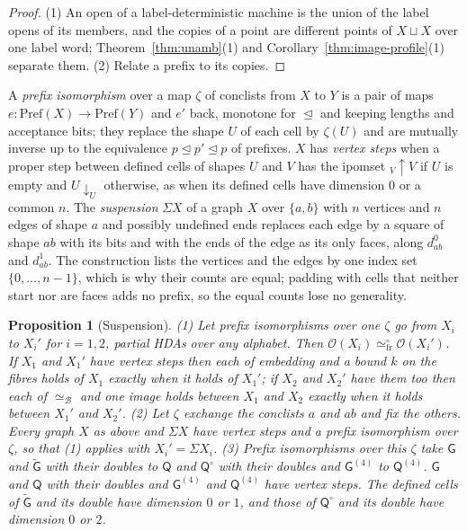 \documentclass{lmcs}
\newtheorem{proposition}[theorem]{Proposition}
\theoremstyle{definition}
\theoremstyle{remark}
\newcommand{\Op}{\mathcal{O}}
\newcommand{\ab}{\{a,b\}}
\newcommand{\starter}[2]{{}_{#2}{\uparrow}{#1}}
\newcommand{\terminator}[2]{{#1}{\downarrow}_{#2}}%
\newcommand{\Pref}{\mathrm{Pref}}
\newcommand{\ext}{\trianglelefteq}
\newcommand{\eqFrF}{\simeq^{\circ}_{\mathrm{fr}}}
\providecommand{\dsum}{\sqcup}
\providecommand{\wQ}{\mathsf{Q}}
\providecommand{\eqB}{\simeq_{\mathcal{B}}}
\providecommand{\dsum}{\sqcup}
\providecommand{\wG}{\mathsf{G}}
\providecommand{\wGt}{\tilde{\mathsf{G}}}
\providecommand{\wQ}{\mathsf{Q}}
\begin{document}
\begin{proof}
(1) An open of a label-deterministic machine is the union of the label opens of its
members, and the copies of a point are different points of $X\dsum X$
over one label word; Theorem~\ref{thm:unamb}(1) and
Corollary~\ref{thm:image-profile}(1) separate
them. (2) Relate
a prefix to its copies.
\end{proof}

A \emph{prefix isomorphism} over a map $\zeta$ of conclists from $X$ to $Y$ is a pair of maps
$e\colon\Pref(X)\to\Pref(Y)$ and $e'$ back, monotone for $\ext$ and keeping lengths and acceptance bits; they
replace the shape $U$ of each cell by $\zeta(U)$ and are mutually inverse up to the equivalence $p\ext p'\ext p$
of prefixes. $X$ has \emph{vertex steps} when a proper step between defined cells of shapes $U$ and
$V$ has the ipomset $\starter{V}{V}$ if $U$ is empty and $\terminator{U}{U}$ otherwise, as when its defined cells
have dimension $0$ or a common $n$. The
\emph{suspension} $\Sigma X$ of a graph $X$ over $\ab$ with $n$ vertices and $n$ edges of shape $a$ and possibly
undefined ends replaces each edge by a square of shape $ab$ with its bits and with the ends of the edge as its only
faces, along $d^0_{ab}$ and $d^1_{ab}$. The construction lists the vertices and the edges by one index set $\{0,\dots,n-1\}$, which is why their counts are
equal; padding with cells that neither start nor are faces adds no prefix, so the equal counts lose
no generality.

\begin{proposition}[Suspension]\label{prop:suspension}
(1) Let prefix isomorphisms over one $\zeta$ go from $X_i$ to $X_i'$ for $i=1,2$, partial HDAs over any alphabet.
  Then $\Op(X_i)\eqFrF\Op(X_i')$. If $X_1$ and $X_1'$ have vertex steps then each of
  embedding and a bound $k$ on the fibres holds of $X_1$ exactly when it holds of $X_1'$;
  if $X_2$ and $X_2'$ have them too then each of $\eqB$ and one image holds between $X_1$ and $X_2$ exactly when it
  holds between $X_1'$ and $X_2'$.
(2) Let $\zeta$ exchange the conclists $a$ and $ab$ and fix the others. Every graph $X$ as above and $\Sigma X$
  have vertex steps and a prefix isomorphism over $\zeta$, so that (1) applies with
  $X_i'=\Sigma X_i$.
(3) Prefix isomorphisms over this $\zeta$ take $\wG$ and $\wGt$ with their doubles to $\wQ$ and $\wQ^\circ$ with
  their doubles and $\wG^{(4)}$ to $\wQ^{(4)}$.
  $\wG$ and $\wQ$ with their doubles and $\wG^{(4)}$ and $\wQ^{(4)}$ have vertex steps. The defined cells of
  $\wGt$ and its double have dimension $0$ or $1$, and
  those of $\wQ^\circ$ and its double have dimension $0$ or $2$.
\end{proposition}
\end{document}
